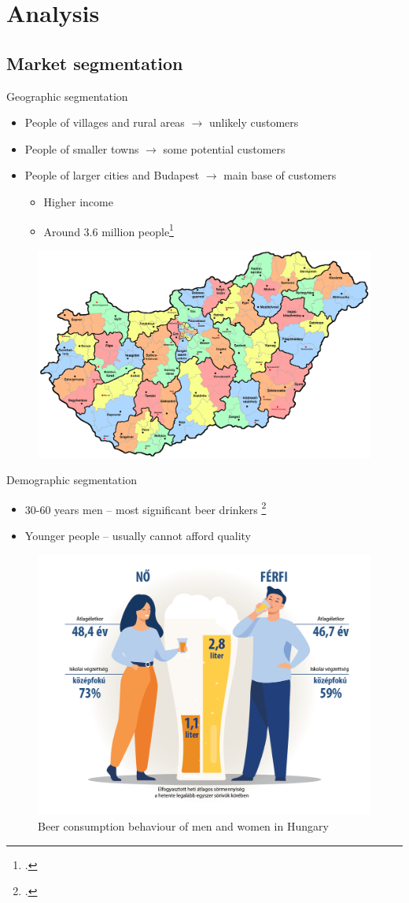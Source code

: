 \documentclass[aspectratio=43]{beamer}
\begin{document}
\section{Analysis}

\subsection{Market segmentation}
\begin{frame}{Geographic segmentation}
   \begin{itemize}
      \item People of villages and rural areas $\rightarrow$ unlikely customers
      \item People of smaller towns $\rightarrow$ some potential customers
      \item People of larger cities and Budapest $\rightarrow$ main base of customers
      \begin{itemize}
         \item Higher income
         \item Around 3.6 million people\footcite{ksh1}
      \end{itemize}
   \end{itemize}

   \begin{figure}[t]
    \centering
    \includegraphics[width=0.45\linewidth]{pics/magyar.jpg}
   \end{figure}
\end{frame}

\begin{frame}{Demographic segmentation}
   \begin{itemize}
      \item 30-60 years men -- most significant beer drinkers \footcite{ksh2}
      \item Younger people -- usually cannot afford quality
   \end{itemize}

   \begin{figure}[H]
     \centering
     \includegraphics[width=0.45\linewidth]{pics/ksh.png}
     \caption*{Beer consumption behaviour of men and women in Hungary}
   \end{figure}

\end{frame}
\end{document}
